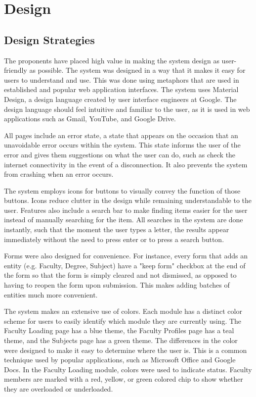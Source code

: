 \chapter{Design}
\section{Design Strategies}
The proponents have placed high value in making the system design as user-friendly as possible. The system was designed in a way that it makes it easy for users to understand and use. This was done using metaphors that are used in established and popular web application interfaces. The system uses Material Design, a design language created by user interface engineers at Google. The design language should feel intuitive and familiar to the user, as it is used in web applications such as Gmail, YouTube, and Google Drive.

All pages include an error state, a state that appears on the occasion that an unavoidable error occurs within the system. This state informs the user of the error and gives them suggestions on what the user can do, such as check the internet connectivity in the event of a disconnection. It also prevents the system from crashing when an error occurs. 
 
The system employs icons for buttons to visually convey the function of those buttons. Icons reduce clutter in the design while remaining understandable to the user. Features also include a search bar to make finding items easier for the user instead of manually searching for the item. All searches in the system are done instantly, such that the moment the user types a letter, the results appear immediately without the need to press enter or to press a search button.

Forms were also designed for convenience. For instance, every form that adds an entity (e.g. Faculty, Degree, Subject) have a "keep form" checkbox at the end of the form so that the form is simply cleared and not dismissed, as opposed to having to reopen the form upon submission. This makes adding batches of entities much more convenient.

The system makes an extensive use of colors. Each module has a distinct color scheme for users to easily identify which module they are currently using. The Faculty Loading page has a blue theme, the Faculty Profiles page has a teal theme, and the Subjects page has a green theme. The differences in the color were designed to make it easy to determine where the user is. This is a common technique used by popular applications, such as Microsoft Office and Google Docs. In the Faculty Loading module, colors were used to indicate status. Faculty members are marked with a red, yellow, or green colored chip to show whether they are overloaded or underloaded.

